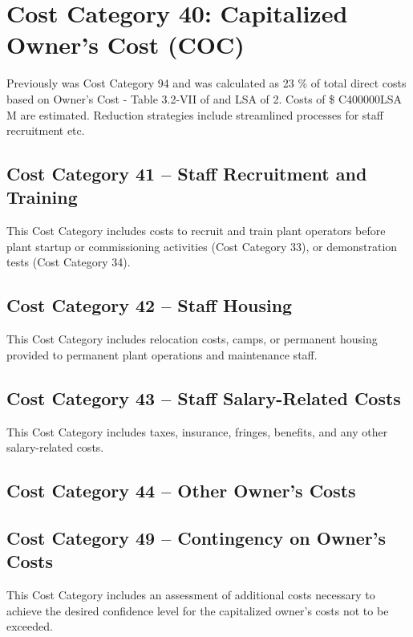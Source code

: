 \section{Cost Category 40: Capitalized Owner’s Cost (COC)}

Previously was Cost Category 94 and was calculated as 23 \% of total direct costs based on Owner's Cost - Table 3.2-VII of \cite{SCH78} and LSA of 2. Costs of \$ C400000LSA M are estimated. Reduction strategies include streamlined processes for staff recruitment etc. 

\subsection*{Cost Category 41 – Staff Recruitment and Training}
This Cost Category includes costs to recruit and train plant operators before plant startup or commissioning activities (Cost Category 33), or demonstration tests (Cost Category 34).

\subsection*{Cost Category 42 – Staff Housing}
This Cost Category includes relocation costs, camps, or permanent housing provided to permanent plant operations and maintenance staff.

\subsection*{Cost Category 43 – Staff Salary-Related Costs}
This Cost Category includes taxes, insurance, fringes, benefits, and any other salary-related costs.

\subsection*{Cost Category 44 – Other Owner’s Costs}

\subsection*{Cost Category 49 – Contingency on Owner’s Costs}
This Cost Category includes an assessment of additional costs necessary to achieve the desired confidence level for the capitalized owner’s costs not to be exceeded.
